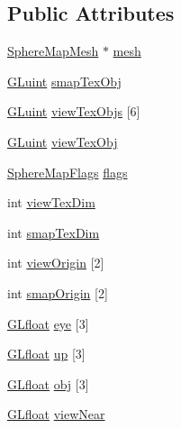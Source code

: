 \subsection*{Public Attributes}
\begin{DoxyCompactItemize}
\item 
\hyperlink{glsmapint_8h_a4965d0c8132b5c0f5a11f1b238d91a7a}{Sphere\-Map\-Mesh} $\ast$ \hyperlink{struct___sphere_map_aadeee07f5f55de1971f98fe89c3c82c7}{mesh}
\item 
\hyperlink{gl_8h_a68c4714e43d8e827d80759f9cb864f3c}{G\-Luint} \hyperlink{struct___sphere_map_a3f4b4ebc84435c496be900cca0103c99}{smap\-Tex\-Obj}
\item 
\hyperlink{gl_8h_a68c4714e43d8e827d80759f9cb864f3c}{G\-Luint} \hyperlink{struct___sphere_map_a34635ed623f295082180f1a6dae69a87}{view\-Tex\-Objs} \mbox{[}6\mbox{]}
\item 
\hyperlink{gl_8h_a68c4714e43d8e827d80759f9cb864f3c}{G\-Luint} \hyperlink{struct___sphere_map_ae13c3fd3977f4de76c99671d3c736f17}{view\-Tex\-Obj}
\item 
\hyperlink{glsmap_8h_a47f0d86b336f12393b51104083f66fd5}{Sphere\-Map\-Flags} \hyperlink{struct___sphere_map_aaedcca05cc381f25caaa216035e61b32}{flags}
\item 
int \hyperlink{struct___sphere_map_a9b58f4b38de6d3925ae1a3795074ddf1}{view\-Tex\-Dim}
\item 
int \hyperlink{struct___sphere_map_a59b4cf016e3fe520652cef083800789f}{smap\-Tex\-Dim}
\item 
int \hyperlink{struct___sphere_map_ae062a12b748d07b243a06554485da9ce}{view\-Origin} \mbox{[}2\mbox{]}
\item 
int \hyperlink{struct___sphere_map_a41758a7953c63d3687e5981b4954bf9a}{smap\-Origin} \mbox{[}2\mbox{]}
\item 
\hyperlink{gl_8h_a31aeedaeef29442c9c015ab355c8f5ab}{G\-Lfloat} \hyperlink{struct___sphere_map_a59f21bb82cae80e5260d98bef2014783}{eye} \mbox{[}3\mbox{]}
\item 
\hyperlink{gl_8h_a31aeedaeef29442c9c015ab355c8f5ab}{G\-Lfloat} \hyperlink{struct___sphere_map_aad20bb4c305d5d233926bd385dc156c5}{up} \mbox{[}3\mbox{]}
\item 
\hyperlink{gl_8h_a31aeedaeef29442c9c015ab355c8f5ab}{G\-Lfloat} \hyperlink{struct___sphere_map_a7a237a3fc3c5315c6db303c4f01ce43b}{obj} \mbox{[}3\mbox{]}
\item 
\hyperlink{gl_8h_a31aeedaeef29442c9c015ab355c8f5ab}{G\-Lfloat} \hyperlink{struct___sphere_map_a421e9bbe724d01a01faf291e6c445c6b}{view\-Near}
\item 

\end{DoxyCompactItemize}
